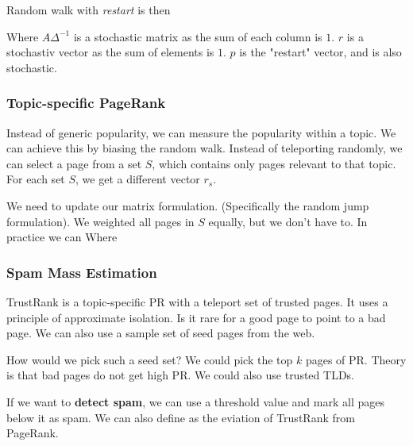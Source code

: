     Random walk with \emph{restart} is then 
    
    Where $A \Delta^{-1}$ is a stochastic matrix as the sum of each column is $1$. $r$ is a stochastiv vector as the sum of elements is $1$. $p$ is the "restart" vector, and is also stochastic. 
    
\subsubsection{Topic-specific PageRank}
    Instead of generic popularity, we can measure the popularity within a topic. We can achieve this by biasing the random walk. Instead of teleporting randomly, we can select a page from a set $S$, which contains only pages relevant to that topic. For each set $S$, we get a different vector $r_s$. 
    
    We need to update our matrix formulation. (Specifically the random jump formulation). 
    We weighted all pages in $S$ equally, but we don't have to. In practice we can 
    Where 
    
\subsubsection{Spam Mass Estimation}
        TrustRank is a topic-specific PR with a teleport set of trusted pages. It uses a principle of approximate isolation. Is it rare for a good page to point to a bad page. We can also use a sample set of seed pages from the web. 
        
        How would we pick such a seed set? We could pick the top $k$ pages of PR. Theory is that bad pages do not get high PR. We could also use trusted TLDs. 
        
        If we want to \textbf{detect spam}, we can use a threshold value and mark all pages below it as spam. We can also define  as the eviation of TrustRank from PageRank.
        
